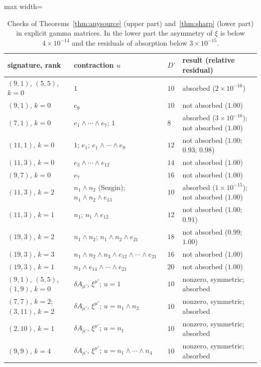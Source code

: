\begin{table}[htbp]
\centering
\begin{adjustbox}{max width=\linewidth}\begin{tabular}{@{}llll@{}}
\toprule
signature, rank & contraction $u$ & $D'$ & result (relative residual)\\
\midrule
$(9,1)$, $(5,5)$, $k=0$ & $1$ & $10$ & absorbed ($2\times10^{-16}$)\\
$(9,1)$, $k=0$ & $e_9$ & $10$ & not absorbed ($1.00$)\\
$(7,1)$, $k=0$ & $e_1\wedge\cdots\wedge e_7$; $1$ & $8$ & absorbed ($3\times10^{-16}$); not absorbed ($1.00$)\\
$(11,1)$, $k=0$ & $1$; $e_1$; $e_1\wedge\cdots\wedge e_9$ & $12$ & not absorbed ($1.00$; $0.93$; $0.98$)\\
$(11,3)$, $k=0$ & $e_3\wedge\cdots\wedge e_{12}$ & $14$ & not absorbed ($1.00$)\\
$(9,7)$, $k=0$ & $e_7$ & $16$ & not absorbed ($1.00$)\\
$(11,3)$, $k=2$ & $n_1\wedge n_2$ (Sezgin); $n_1\wedge n_2\wedge e_{13}$ & $10$ & absorbed ($1\times10^{-15}$); not absorbed ($1.00$)\\
$(11,3)$, $k=1$ & $n_1$; $n_1\wedge e_{12}$ & $12$ & not absorbed ($1.00$; $0.91$)\\
$(19,3)$, $k=2$ & $n_1\wedge n_2$; $n_1\wedge n_2\wedge e_{21}$ & $18$ & not absorbed ($0.99$; $1.00$)\\
$(19,3)$, $k=3$ & $n_1\wedge n_2\wedge n_3\wedge e_{12}\wedge\cdots\wedge e_{21}$ & $16$ & not absorbed ($1.00$)\\
$(19,3)$, $k=1$ & $n_1\wedge e_{14}\wedge\cdots\wedge e_{21}$ & $20$ & not absorbed ($1.00$)\\
\midrule
$(9,1)$, $(5,5)$, $(1,9)$, $k=0$ & $\delta A_{\mu'}$, $\xi^{\mu'}$; $u=1$ & $10$ & nonzero, symmetric; absorbed\\
$(7,7)$, $k=2$; $(3,11)$, $k=2$ & $\delta A_{\mu'}$, $\xi^{\mu'}$; $u=n_1\wedge n_2$ & $10$ & nonzero, symmetric; absorbed\\
$(2,10)$, $k=1$ & $\delta A_{\mu'}$, $\xi^{\mu'}$; $u=n_1$ & $10$ & nonzero, symmetric; absorbed\\
$(9,9)$, $k=4$ & $\delta A_{\mu'}$, $\xi^{\mu'}$; $u=n_1\wedge\cdots\wedge n_4$ & $10$ & nonzero, symmetric; absorbed\\
\bottomrule
\end{tabular}\end{adjustbox}
\caption{Checks of Theorems~\ref{thm:anysource} (upper part) and~\ref{thm:sharp} (lower part) in explicit gamma matrices. In the lower part the asymmetry of $\xi$ is below $4\times10^{-14}$ and the residuals of absorption below $3\times10^{-15}$.}
\label{tab:contractioncheck}
\end{table}

